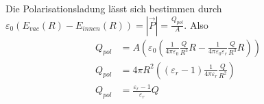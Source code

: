 \documentclass[sectionformat=aufgabe]{gadsescript}
\begin{document}
Die Polarisationsladung lässt sich bestimmen durch
$ \varepsilon _0 \left( E_{vac}(R) - E_{innen}(R)  \right) = \left| \vec P \right| = \frac{ Q_{pol}  }{ A }  $.
Also
\begin{align*}
	Q_{pol}  &= A \left( \varepsilon _0 \left( \frac{ 1 }{ 4 \pi \varepsilon _0 } \frac{ Q }{ R^3 } R - \frac{ 1 }{ 4 \pi \varepsilon _0 \varepsilon _r } \frac{ Q }{ R^3 } R \right) \right)  \\
	Q_{pol}  &= 4 \pi R^2 \left( (\varepsilon _r - 1) \frac{ 1 }{ 4 \pi \varepsilon _r } \frac{ Q }{ R^2 }  \right)  \\
	Q_{pol}  &= \frac{ \varepsilon _r - 1 }{ \varepsilon _r } Q \\
\end{align*}
\end{document}
